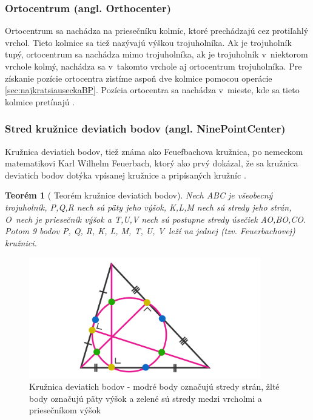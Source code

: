 \subsubsection{Ortocentrum (angl. Orthocenter)}
Ortocentrum sa nachádza na priesečníku kolmíc, ktoré prechádzajú cez protiľahlý vrchol. Tieto kolmice sa tiež nazývajú výškou trojuholníka. 
Ak je trojuholník tupý, ortocentrum sa nachádza mimo trojuholníka, ak je trojuholník v~niektorom vrchole kolmý, nachádza sa v~takomto vrchole aj ortocentrum trojuholníka.
Pre získanie pozície ortocentra zistíme aspoň dve kolmice pomocou operácie \ref{sec:najkratsiauseckaBP}. Pozícia ortocentra sa nachádza v~mieste, kde sa tieto kolmice pretínajú \cite{kelley2013humongous}. 


\subsubsection{Stred kružnice deviatich bodov (angl. NinePointCenter)}

Kružnica deviatich bodov, tiež známa ako Feuefbachova kružnica, po nemeckom matematikovi Karl Wilhelm Feuerbach, ktorý ako prvý dokázal, že sa kružnica deviatich bodov dotýka vpísanej kružnice a pripísaných kružníc \cite{NinePointTheorem}.


\newtheorem{theorem}{Teorém}
 
\begin{theorem}[{\cite{NinePointTheorem} Teorém kružnice deviatich bodov}]
Nech ABC je všeobecný trojuholník, P,Q,R nech sú päty jeho výšok, K,L,M nech sú stredy jeho strán, O~nech je priesečník výšok a T,U,V nech sú postupne stredy úsečiek AO,BO,CO. Potom 9 bodov P, Q, R, K, L, M, T, U, V~leží na jednej (tzv. Feuerbachovej) kružnici. 

\end{theorem}


\begin{figure}[H]
	\centering
	\includegraphics[width=0.9\textwidth]{obrazky-figures/NinePointCircle.png}
	\caption{Kružnica deviatich bodov - modré body označujú stredy strán, žlté body označujú päty výšok a zelené sú stredy medzi vrcholmi a priesečníkom výšok \protect\footnotemark
	}
	\label{fig:TriangleCenters_ninePoints}
\end{figure}

